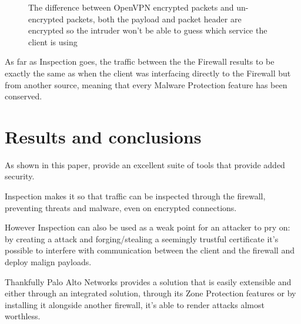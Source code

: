\begin{figure}[!hb]
 \centering
 \vspace{0.5cm}
 \caption{The difference between OpenVPN encrypted packets and un-encrypted packets, both the payload and packet header are encrypted so the intruder won't be able to guess which service the client is using}
\end{figure}

As far as  Inspection goes, the traffic between the  the Firewall results to be exactly the same as when the client was interfacing directly to the Firewall but from another source, meaning that every Malware Protection feature has been conserved.

\chapter{Results and conclusions}

As shown in this paper,  provide an excellent suite of tools that provide added security.

 Inspection makes it so that traffic can be inspected through the firewall, preventing threats and malware, even on encrypted connections.

However  Inspection can also be used as a weak point for an attacker to pry on: by creating a  attack and forging/stealing a seemingly trustful certificate it's possible to interfere with communication between the client and the firewall and deploy malign payloads.

Thankfully Palo Alto Networks provides a  solution that is easily extensible and either through an integrated  solution, through its Zone Protection features  or by installing it alongside another firewall, it's able to render  attacks almost worthless.

